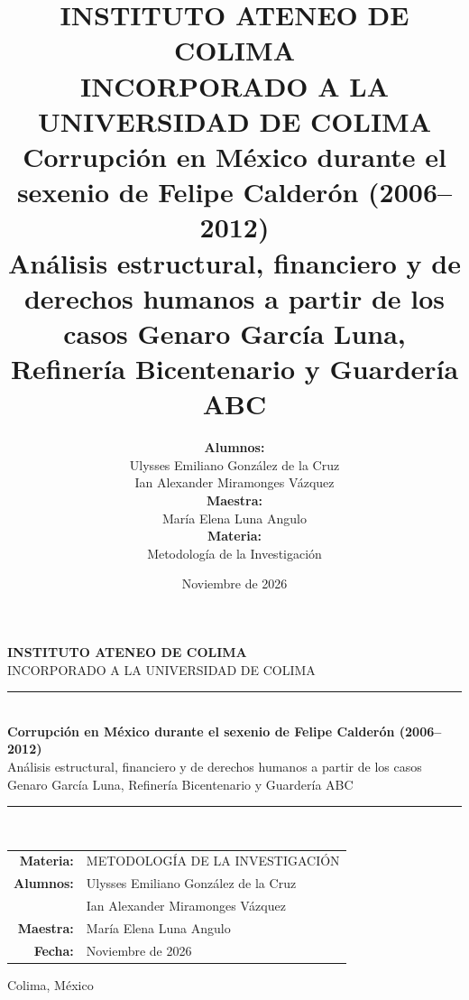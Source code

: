 \documentclass[12pt,letterpaper,oneside]{article}
\title{%
  {\Large\sffamily\textbf{INSTITUTO ATENEO DE COLIMA}}\\[0.3cm]
  {\normalsize INCORPORADO A LA UNIVERSIDAD DE COLIMA}\\[1.2cm]
  {\LARGE\sffamily\bfseries Corrupción en México durante el sexenio de Felipe Calderón (2006–2012)}\\[0.5cm]
  {\large Análisis estructural, financiero y de derechos humanos a partir de los casos Genaro García Luna, Refinería Bicentenario y Guardería ABC}
}
\author{%
  \textbf{Alumnos:}\\
  Ulysses Emiliano González de la Cruz\\
  Ian Alexander Miramonges Vázquez\\[1cm]
  \textbf{Maestra:}\\
  María Elena Luna Angulo\\[0.5cm]
  \textbf{Materia:}\\
  Metodología de la Investigación
}
\date{Noviembre de 2026}
\begin{document}

\begin{titlepage}
  \centering
  \vspace*{1cm}
  
  
  {\Large\sffamily\textbf{INSTITUTO ATENEO DE COLIMA}}\\[0.3cm]
  {\normalsize INCORPORADO A LA UNIVERSIDAD DE COLIMA}\\[1.8cm]
  
  {\color{blue!70!black}\rule{0.85\linewidth}{1.5pt}}\\[0.6cm]
  
  {\Huge\sffamily\bfseries Corrupción en México durante el sexenio de Felipe Calderón (2006–2012)}\\[0.8cm]
  
  {\Large Análisis estructural, financiero y de derechos humanos a partir de los casos Genaro García Luna, Refinería Bicentenario y Guardería ABC}\\[0.6cm]
  
  {\color{blue!70!black}\rule{0.70\linewidth}{1.2pt}}\\[2cm]
  
  \begin{tabular}{rl}
    \textbf{Materia:} & METODOLOGÍA DE LA INVESTIGACIÓN \\[0.3cm]
    \textbf{Alumnos:} & Ulysses Emiliano González de la Cruz \\
                      & Ian Alexander Miramonges Vázquez \\[0.3cm]
    \textbf{Maestra:} & María Elena Luna Angulo \\[0.3cm]
    \textbf{Fecha:} & Noviembre de 2026
  \end{tabular}
  
  \vfill
  
  {\small Colima, México}
  
\end{titlepage}

\end{document}
